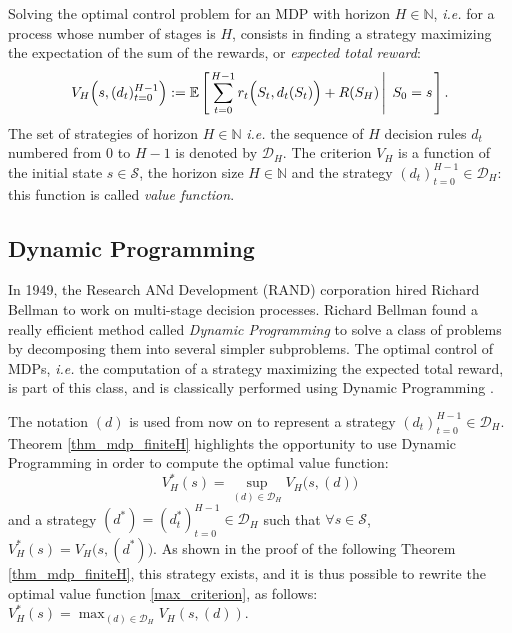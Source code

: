 Solving the optimal control problem
for an MDP with horizon $H \in \mathbb{N}$,
\textit{i.e.} for a process whose number of stages is $H$,
consists in finding a strategy maximizing 
the expectation of the sum of the rewards, 
or \textit{expected total reward}: 
\begin{equation} 
\label{criterion} 
V_H \Big( s,(d_t)_{t=0}^{ H-1 } \Big) 
:= \mathbb{E} \left[ \left.  \sum_{t=0}^{H-1} r_t \Big( S_t,d_t(S_t) \Big) + R(S_H) \, \right| \left. \, S_0=s  \right. \right].
\end{equation} 
The set of strategies of horizon $H \in \mathbb{N}$ 
\textit{i.e.} the sequence of $H$ decision rules $d_t$
numbered from $0$ to $H-1$ is denoted by $\mathcal{D}_H$.
The criterion $V_H$ is a function of the initial state $s \in \mathcal{S}$, 
the horizon size $H \in \mathbb{N}$ 
and the strategy $(d_t)_{t=0}^{H-1} \in \mathcal{D}_H$: 
this function is called \textit{value function}. 
\subsection{Dynamic Programming}
\label{subsectionDP}
In 1949, the Research ANd Development (RAND) corporation 
hired Richard Bellman to work on multi-stage decision processes.
Richard Bellman found a really efficient method
called \textit{Dynamic Programming} \cite{bellman54}
to solve a class of problems by decomposing them 
into several simpler subproblems.
The optimal control of MDPs,
\textit{i.e.} the computation of a strategy
maximizing the expected total reward, is part of this class,
and is classically performed using Dynamic Programming \cite{puterman94}.

The notation $(d)$ is used from now on
to represent a strategy $(d_t)_{t=0}^{H-1} \in \mathcal{D}_H$.
Theorem \ref{thm_mdp_finiteH} highlights the opportunity 
to use Dynamic Programming 
in order to compute the optimal value function:
\begin{equation}
\label{max_criterion} 
V^*_H(s)= \sup_{(d) \in \mathcal{D}_H}  V_H \Big( s,(d) \Big) 
\end{equation}
and a strategy $(d^*) = (d^*_t)_{t=0}^{H-1} \in \mathcal{D}_H$ 
such that $\forall s \in \mathcal{S}$, 
$V_H^*(s) = V_H \Big(s,(d^*)\Big)$.
As shown in the proof of the following Theorem \ref{thm_mdp_finiteH}, 
this strategy exists, and
it is thus possible to rewrite the optimal value function \ref{max_criterion},
as follows: $\displaystyle V^*_H(s)= \max_{(d) \in \mathcal{D}_H}  V_H(s,(d))$.  


